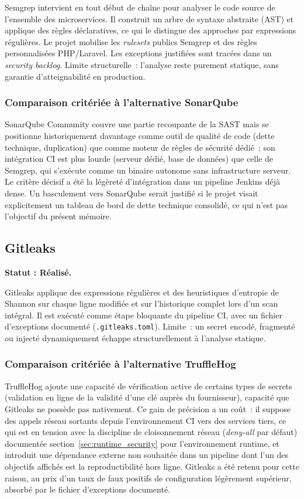 Semgrep intervient en tout début de chaîne pour analyser le code source de l'ensemble des microservices. Il construit un arbre de syntaxe abstraite (AST) et applique des règles déclaratives, ce qui le distingue des approches par expressions régulières. Le projet mobilise les \textit{rulesets} publics Semgrep et des règles personnalisées PHP/Laravel. Les exceptions justifiées sont tracées dans un \textit{security backlog}. Limite structurelle~: l'analyse reste purement statique, sans garantie d'atteignabilité en production.

\subsubsection{Comparaison critériée à l'alternative SonarQube}
SonarQube Community couvre une partie recoupante de la SAST mais se positionne historiquement davantage comme outil de qualité de code (dette technique, duplication) que comme moteur de règles de sécurité dédié~; son intégration CI est plus lourde (serveur dédié, base de données) que celle de Semgrep, qui s'exécute comme un binaire autonome sans infrastructure serveur. Le critère décisif a été la légèreté d'intégration dans un pipeline Jenkins déjà dense. Un basculement vers SonarQube serait justifié si le projet visait explicitement un tableau de bord de dette technique consolidé, ce qui n'est pas l'objectif du présent mémoire.

\subsection{Gitleaks}
\textbf{Statut : Réalisé.}

Gitleaks applique des expressions régulières et des heuristiques d'entropie de Shannon sur chaque ligne modifiée et sur l'historique complet lors d'un scan intégral. Il est exécuté comme étape bloquante du pipeline CI, avec un fichier d'exceptions documenté (\texttt{.gitleaks.toml}). Limite~: un secret encodé, fragmenté ou injecté dynamiquement échappe structurellement à l'analyse statique.

\subsubsection{Comparaison critériée à l'alternative TruffleHog}
TruffleHog ajoute une capacité de vérification active de certains types de secrets (validation en ligne de la validité d'une clé auprès du fournisseur), capacité que Gitleaks ne possède pas nativement. Ce gain de précision a un coût~: il suppose des appels réseau sortants depuis l'environnement CI vers des services tiers, ce qui est en tension avec la discipline de cloisonnement réseau (\textit{deny-all} par défaut) documentée section~\ref{sec:runtime_security} pour l'environnement runtime, et introduit une dépendance externe non souhaitée dans un pipeline dont l'un des objectifs affichés est la reproductibilité hors ligne. Gitleaks a été retenu pour cette raison, au prix d'un taux de faux positifs de configuration légèrement supérieur, absorbé par le fichier d'exceptions documenté.

